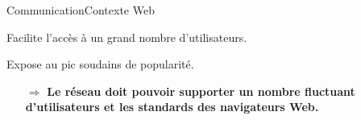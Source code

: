 

\begin{frame}{Communication}{Contexte Web}



  
  Facilite l'accès à un grand nombre d'utilisateurs.


  
  \vspace{0.5cm}

  Expose au pic soudains de popularité.


 
  \vspace{0.5cm}
  \large
  \begin{itemize}
  \item [$\Rightarrow$] \textbf{Le réseau doit pouvoir supporter un nombre
      fluctuant d'utilisateurs et les standards des navigateurs Web.}
  \end{itemize}

\end{frame}



